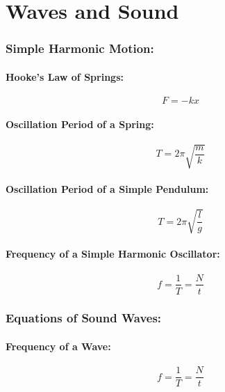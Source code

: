 \documentclass[a4paper]{report}
\begin{document}
\addtocounter{chapter}{1}


\chapter{Waves and Sound}
    \subsection{Simple Harmonic Motion:}
        \subsubsection{Hooke's Law of Springs:}
            \begin{equation}
                F = -kx
            \end{equation}
        \subsubsection{Oscillation Period of a Spring:}
            \begin{equation}
                T = 2 \pi \sqrt{\frac{m}{k}}
            \end{equation}
        \subsubsection{Oscillation Period of a Simple Pendulum:}
            \begin{equation}
                T = 2 \pi \sqrt{\frac{l}{g}}
            \end{equation}
        \subsubsection{Frequency of a Simple Harmonic Oscillator:}
            \begin{equation}
                f = \frac{1}{T} = \frac{N}{t}
            \end{equation}
    \subsection{Equations of Sound Waves:}
        \subsubsection{Frequency of a Wave: }
            \begin{equation}
                f = \frac{1}{T} = \frac{N}{t}
            \end{equation}
\end{document}
